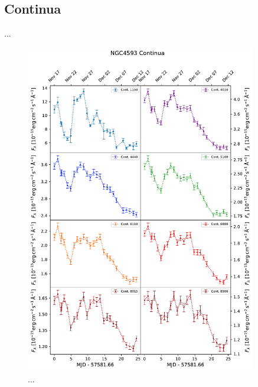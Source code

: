 \subsection{Continua}
...
\begin{figure}[!ht]
	\centering
	\includegraphics[width=0.9\textwidth]{pictures/Chapter4/lightcurves/NGC4593_Continua.pdf}
	\caption{...}
	\label{fig:continua_lightcurves}
\end{figure}

